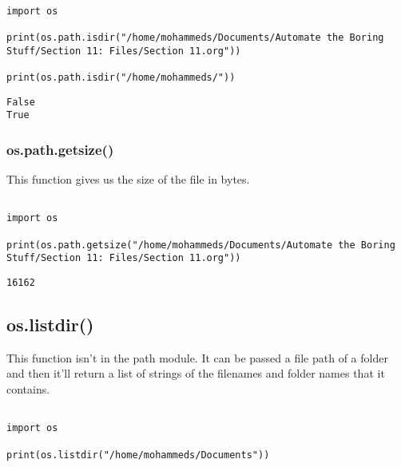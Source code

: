 \documentclass[11pt]{article}
\begin{document}
\begin{verbatim}

import os

print(os.path.isdir("/home/mohammeds/Documents/Automate the Boring Stuff/Section 11: Files/Section 11.org"))

print(os.path.isdir("/home/mohammeds/"))

\end{verbatim}

\begin{verbatim}
False
True
\end{verbatim}

\subsubsection{os.path.getsize()}
\label{sec:orgad0b03a}

This function gives us the size of the file in bytes.

\begin{verbatim}

import os

print(os.path.getsize("/home/mohammeds/Documents/Automate the Boring Stuff/Section 11: Files/Section 11.org"))

\end{verbatim}

\begin{verbatim}
16162
\end{verbatim}

\subsection{os.listdir()}
\label{sec:org532ebb1}

This function isn't in the path module. It can be passed a file path of a folder and then it'll return a list of strings of the filenames and folder names that it contains.

\begin{verbatim}

import os

print(os.listdir("/home/mohammeds/Documents"))

\end{verbatim}
\end{document}
